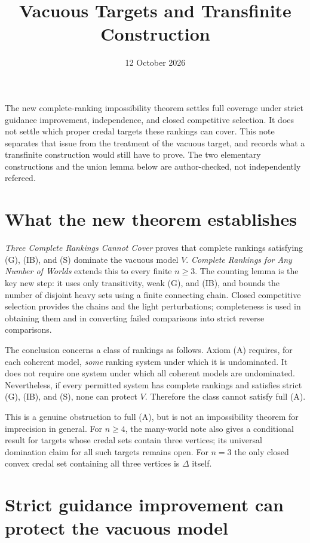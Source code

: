 \documentclass[11pt]{article}
\title{Vacuous Targets and Transfinite Construction}
\author{}\date{12 October 2026}
\theoremstyle{remark}\newtheorem{remark}[proposition]{Remark}
\begin{document}
\maketitle

\noindent
The new complete-ranking impossibility theorem settles full coverage
under strict guidance improvement, independence, and closed competitive
selection. It does not settle which proper credal targets these rankings
can cover. This note separates that issue from the treatment of the
vacuous target, and records what a transfinite construction would still
have to prove. The two elementary constructions and the union lemma
below are author-checked, not independently refereed.

\section{What the new theorem establishes}

\emph{Three Complete Rankings Cannot Cover} proves that complete
rankings satisfying (G), (IB), and (S) dominate the vacuous model $V$.
\emph{Complete Rankings for Any Number of Worlds} extends this to every
finite $n\ge3$. The counting lemma is the key new step: it uses only
transitivity, weak (G), and (IB), and bounds the number of disjoint heavy
sets using a finite connecting chain. Closed competitive selection
provides the chains and the light perturbations; completeness is used
in obtaining them and in converting failed comparisons into strict
reverse comparisons.

The conclusion concerns a class of rankings as follows. Axiom (A)
requires, for each coherent model, \emph{some} ranking system under which
it is undominated. It does not require one system under which all
coherent models are undominated. Nevertheless, if every permitted
system has complete rankings and satisfies strict (G), (IB), and (S),
none can protect $V$. Therefore the class cannot satisfy full (A).

This is a genuine obstruction to full (A), but is not an impossibility
theorem for imprecision in general. For $n\ge4$, the many-world note
also gives a conditional result for targets whose credal sets contain
three vertices; its universal domination claim for all such targets
remains open. For $n=3$ the only closed convex credal set containing all
three vertices is $\Delta$ itself.

\section{Strict guidance improvement can protect the vacuous model}
\end{document}
